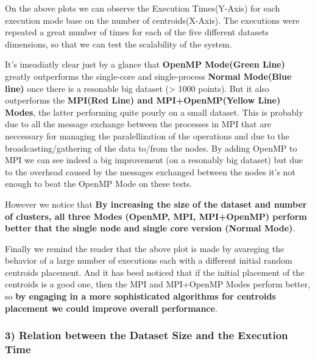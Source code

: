 \documentclass[11pt]{article}
\begin{document}
On the above plots we can observe the Execution Times(Y-Axis) for each
execution mode base on the number of centroids(X-Axis). The executions
were repeated a great number of times for each of the five different
datasets dimensions, so that we can test the scalability of the system.

It's imeadiatly clear just by a glance that \textbf{OpenMP Mode(Green
Line)} greatly outperforms the single-core and single-process
\textbf{Normal Mode(Blue line)} once there is a resonable big dataset
(\textgreater{} 1000 points). But it also outperforms the
\textbf{MPI(Red Line) and MPI+OpenMP(Yellow Line) Modes}, the latter
performing quite pourly on a small dataset. This is probably due to all
the message exchange between the processes in MPI that are neccessary
for managing the paralellization of the operations and due to the
broadcasting/gathering of the data to/from the nodes. By adding OpenMP
to MPI we can see indeed a big improvement (on a resonably big dataset)
but due to the overhead caused by the messages exchanged between the
nodes it's not enough to beat the OpenMP Mode on these tests.

However we notice that \textbf{By increasing the size of the dataset and
number of clusters, all three Modes (OpenMP, MPI, MPI+OpenMP) perform
better that the single node and single core version (Normal Mode)}.

Finally we remind the reader that the above plot is made by avareging
the behavior of a large number of executions each with a different
initial random centroids placement. And it has beed noticed that if the
initial placement of the centroids is a good one, then the MPI and
MPI+OpenMP Modes perform better, so \textbf{by engaging in a more
sophisticated algorithms for centroids placement we could improve
overall performance}.

    \hypertarget{relation-between-the-dataset-size-and-the-execution-time}{%
\subsubsection{3) Relation between the Dataset Size and the Execution
Time}\label{relation-between-the-dataset-size-and-the-execution-time}}
\end{document}
